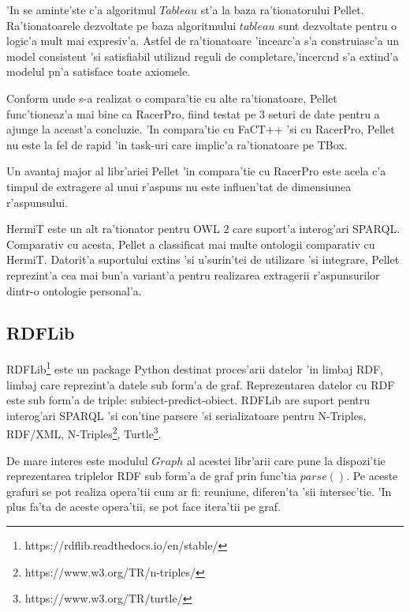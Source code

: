 \documentclass[12pt,a4paper,twoside]{report}
\begin{document}
'In \cite{tableau_alg} se aminte'ste c'a algoritmul $Tableau$ st'a la baza ra'tionatorului Pellet. Ra'tionatoarele dezvoltate pe baza algoritmului $tableau$ sunt dezvoltate pentru o logic'a mult mai expresiv'a. Astfel de ra'tionatoare 'incearc'a s'a construiasc'a un model consistent 'si satisfiabil utiliz\ia nd reguli de completare,'incerc\ia nd s'a extind'a modelul p\ia n'a satisface toate axiomele.

Conform \cite{SirinPellet:Reasoner} unde s-a realizat o compara'tie cu alte ra'tionatoare, Pellet func'tioneaz'a mai bine ca RacerPro, fiind testat pe 3 seturi de date pentru a ajunge la aceast'a concluzie. 'In compara'tie cu FaCT++ 'si cu RacerPro, Pellet nu este la fel de rapid 'in task-uri care implic'a ra'tionatoare pe TBox. 

Un avantaj major al libr'ariei Pellet 'in compara'tie cu RacerPro este acela c'a timpul de extragere al unui r'aspuns nu este influen'tat de dimensiunea r'aspunsului. 

HermiT este un alt ra'tionator pentru OWL 2 care suport'a interog'ari SPARQL. Comparativ cu acesta, Pellet a classificat mai multe ontologii comparativ cu HermiT. Datorit'a suportului extins 'si u'surin'tei de utilizare 'si integrare,  Pellet reprezint'a cea mai bun'a variant'a pentru realizarea extragerii r'aspunsurilor dintr-o ontologie personal'a. 


\subsection{RDFLib}

RDFLib\footnote{https://rdflib.readthedocs.io/en/stable/} este un package Python destinat proces'arii datelor 'in limbaj RDF, limbaj care reprezint'a datele sub form'a de graf. Reprezentarea datelor cu RDF este sub form'a de triple: subiect-predict-obiect. RDFLib are suport pentru interog'ari SPARQL 'si con'tine parsere 'si serializatoare pentru N-Triples, RDF/XML, N-Triples\footnote{https://www.w3.org/TR/n-triples/}, Turtle\footnote{https://www.w3.org/TR/turtle/}.

De mare interes este modulul $Graph$ al acestei libr'arii care pune la dispozi'tie reprezentarea triplelor RDF sub form'a de graf prin func'tia $parse()$. Pe aceste grafuri se pot realiza opera'tii cum ar fi: reuniune, diferen'ta 'sii intersec'tie. 'In plus fa'ta de aceste opera'tii, se pot face itera'tii pe graf.
\end{document}
